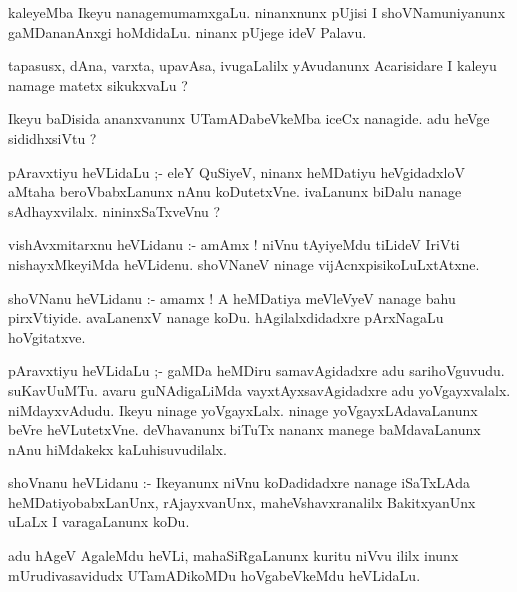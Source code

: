 \documentclass{article}
\begin{document}
\begin{mn}
kaleyeMba  Ikeyu  nanagemumamxgaLu.  ninanxnunx  pUjisi  I  shoVNamuniyanunx  gaMDananAnxgi  hoMdidaLu.  
ninanx  pUjege  ideV  Palavu.
\end{mn}

\begin{mn}
tapasusx,  dAna,  varxta,  upavAsa,  ivugaLalilx  yAvudanunx  Acarisidare  I  kaleyu  namage  matetx  sikukxvaLu ?
\end{mn}

\begin{mn}
Ikeyu  baDisida  ananxvanunx  UTamADabeVkeMba  iceCx  nanagide.  adu  heVge  sididhxsiVtu ?
\end{mn}

\begin{mn}
pAravxtiyu  heVLidaLu ;- eleY  QuSiyeV,  ninanx  heMDatiyu  heVgidadxloV  aMtaha  beroVbabxLanunx  nAnu  
koDutetxVne.  ivaLanunx  biDalu  nanage  sAdhayxvilalx.  nininxSaTxveVnu ?
\end{mn}

\begin{mn}
vishAvxmitarxnu  heVLidanu :- amAmx !  niVnu  tAyiyeMdu  tiLideV  IriVti  nishayxMkeyiMda  heVLidenu.  
shoVNaneV  ninage  vijAcnxpisikoLuLxtAtxne.
\end{mn}

\begin{mn}
shoVNanu  heVLidanu :- amamx !  A  heMDatiya  meVleVyeV  nanage  bahu  pirxVtiyide.  avaLanenxV  nanage  koDu.  
hAgilalxdidadxre  pArxNagaLu  hoVgitatxve.
\end{mn}

\begin{mn}
pAravxtiyu  heVLidaLu ;-  gaMDa heMDiru  samavAgidadxre  adu  sarihoVguvudu.  suKavUuMTu.  avaru  guNAdigaLiMda  
vayxtAyxsavAgidadxre  adu  yoVgayxvalalx.  niMdayxvAdudu.  Ikeyu  ninage  yoVgayxLalx.  ninage  yoVgayxLAdavaLanunx  
beVre  heVLutetxVne.  deVhavanunx  biTuTx  nananx  manege  baMdavaLanunx  nAnu  hiMdakekx  kaLuhisuvudilalx.
\end{mn}

\begin{mn}
shoVnanu  heVLidanu :- Ikeyanunx  niVnu  koDadidadxre  nanage  iSaTxLAda  heMDatiyobabxLanUnx,  rAjayxvanUnx,  
maheVshavxranalilx  BakitxyanUnx  uLaLx  I  varagaLanunx  koDu.
\end{mn}

\begin{mn}
adu  hAgeV  AgaleMdu  heVLi,  mahaSiRgaLanunx  kuritu  niVvu  ililx  inunx  mUrudivasavidudx  UTamADikoMDu  
hoVgabeVkeMdu  heVLidaLu.
\end{mn}
\end{document}
